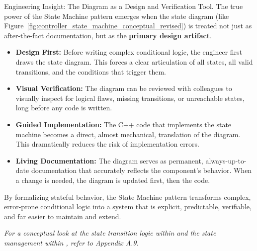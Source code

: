 \begin{principlebox}{Engineering Insight: The Diagram as a Design and Verification Tool.}
    The true power of the State Machine pattern emerges when the state diagram (like Figure~\ref{fig:controller_state_machine_conceptual_revised}) is treated not just as after-the-fact documentation, but as the \textbf{primary design artifact}.
    \begin{itemize}
        \item \textbf{Design First:} Before writing complex conditional logic, the engineer first draws the state diagram. This forces a clear articulation of all states, all valid transitions, and the conditions that trigger them.
        \item \textbf{Visual Verification:} The diagram can be reviewed with colleagues to visually inspect for logical flaws, missing transitions, or unreachable states, long before any code is written.
        \item \textbf{Guided Implementation:} The C++ code that implements the state machine becomes a direct, almost mechanical, translation of the diagram. This dramatically reduces the risk of implementation errors.
        \item \textbf{Living Documentation:} The diagram serves as permanent, always-up-to-date documentation that accurately reflects the component's behavior. When a change is needed, the diagram is updated first, then the code.
    \end{itemize}
\end{principlebox}

By formalizing stateful behavior, the State Machine pattern transforms complex, error-prone conditional logic into a system that is explicit, predictable, verifiable, and far easier to maintain and extend.

\textit{For a conceptual look at the state transition logic within  and the state management within , refer to Appendix A.9.}







